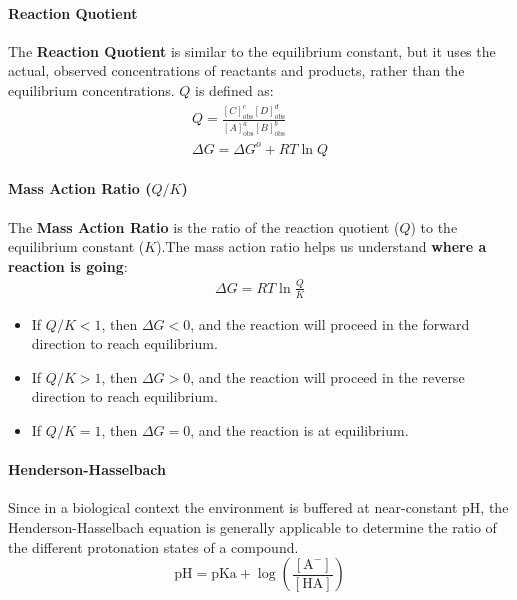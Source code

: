 \documentclass[../main.tex]{subfiles}
\begin{document}
\paragraph{Reaction Quotient}
The \textbf{Reaction Quotient} is similar to the equilibrium constant, but it uses the actual, observed concentrations of reactants and products, rather than the equilibrium concentrations. \( Q \) is defined as:
\begin{align}
	Q = \frac{[C]_{\text{obs}}^c [D]_{\text{obs}}^d}{[A]_{\text{obs}}^a [B]_{\text{obs}}^b}\\
	\Delta G = \Delta G^o + RT \ln Q
\end{align}

\paragraph{Mass Action Ratio (\( Q/K \))}
The \textbf{Mass Action Ratio} is the ratio of the reaction quotient (\( Q \)) to the equilibrium constant (\( K \)).The mass action ratio helps us understand \textbf{where a reaction is going}:
\begin{align}
	\Delta G =  RT \ln \frac{Q}{K}
\end{align}
\begin{itemize}
	\item If \( Q/K < 1 \), then \( \Delta G < 0 \), and the reaction will proceed in the forward direction to reach equilibrium.
	\item If \( Q/K > 1 \), then \( \Delta G > 0 \), and the reaction will proceed in the reverse direction to reach equilibrium.
	\item If \( Q/K = 1 \), then \( \Delta G = 0 \), and the reaction is at equilibrium.
\end{itemize}

\paragraph{Henderson-Hasselbach}
Since in a biological context the environment is buffered at near-constant pH, the Henderson-Hasselbach equation is generally applicable to determine the ratio of the different protonation states of a compound. 
\[
\text{pH} = \text{pKa} + \log \left( \frac{[\text{A}^-]}{[\text{HA}]} \right)
\]
\end{document}

